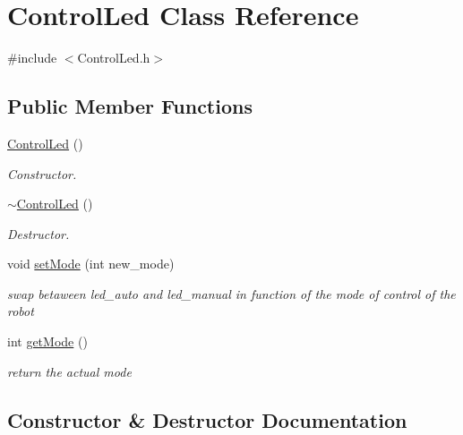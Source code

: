\hypertarget{class_control_led}{}\section{Control\+Led Class Reference}
\label{class_control_led}


{\ttfamily \#include $<$Control\+Led.\+h$>$}

\subsection*{Public Member Functions}
\begin{DoxyCompactItemize}
\item 
\hyperlink{class_control_led_a2dfd53116afc4c052382a98f15bc8c27}{Control\+Led} ()
\begin{DoxyCompactList}\small\item\em Constructor. \end{DoxyCompactList}\item 
\hyperlink{class_control_led_a000f646cd9b99279b59563a990a8a13c}{$\sim$\+Control\+Led} ()
\begin{DoxyCompactList}\small\item\em Destructor. \end{DoxyCompactList}\item 
void \hyperlink{class_control_led_abf3b6b900e2ab5bb0d5e2ce3bdfa7bfa}{set\+Mode} (int new\+\_\+mode)
\begin{DoxyCompactList}\small\item\em swap betaween led\+\_\+auto and led\+\_\+manual in function of the mode of control of the robot \end{DoxyCompactList}\item 
int \hyperlink{class_control_led_a65c6179e8e2a3147cbfb774aebab29e8}{get\+Mode} ()
\begin{DoxyCompactList}\small\item\em return the actual mode \end{DoxyCompactList}\end{DoxyCompactItemize}


\subsection{Constructor \& Destructor Documentation}
\mbox{\label{class_control_led_a2dfd53116afc4c052382a98f15bc8c27}} 
